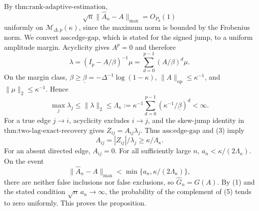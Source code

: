 By \(\text{thm:rank-adaptive-estimation}\),
\[
 \sqrt n\lVert\widehat A_n-A\rVert_{\max}=O_{P_\theta}(1)
\tag{1}
\]
uniformly on \(\mathcal M_{\Delta,p}(\kappa)\), since the maximum norm is bounded by the Frobenius norm.  We convert \(\text{ass:edge-gap}\), which is stated for the signed jump, to a uniform amplitude margin.  Acyclicity gives \(A^p=0\) and therefore
\[
 \lambda=(I_p-A/\beta)^{-1}\mu
 =\sum_{d=0}^{p-1}(A/\beta)^d\mu.
\tag{2}
\]
On the margin class, \(\beta\geq\underline\beta=-\Delta^{-1}\log(1-\kappa)\), \(\lVert A\rVert_{\mathrm{op}}\leq\kappa^{-1}\), and \(\lVert\mu\rVert_2\leq\kappa^{-1}\).  Hence
\[
 \max_j\lambda_j\leq\lVert\lambda\rVert_2
 \leq\Lambda_\kappa:=\kappa^{-1}
 \sum_{d=0}^{p-1}(\kappa^{-1}/\underline\beta)^d<\infty.
\tag{3}
\]
For a true edge \(j\to i\), acyclicity excludes \(i\to j\), and the skew-jump identity in \(\text{thm:two-lag-exact-recovery}\) gives \(Z_{ij}=A_{ij}\lambda_j\).  Thus \(\text{ass:edge-gap}\) and (3) imply
\[
 A_{ij}=|Z_{ij}|/\lambda_j\geq\kappa/\Lambda_\kappa.
\tag{4}
\]
For an absent directed edge, \(A_{ij}=0\).  For all sufficiently large \(n\), \(a_n<\kappa/(2\Lambda_\kappa)\).  On the event
\[
 \lVert\widehat A_n-A\rVert_{\max}
 <\min\{a_n,\kappa/(2\Lambda_\kappa)\},
\tag{5}
\]
there are neither false inclusions nor false exclusions, so \(\widehat G_n=G(A)\).  By (1) and the stated condition \(\sqrt n\,a_n\to\infty\), the probability of the complement of (5) tends to zero uniformly.  This proves the proposition.